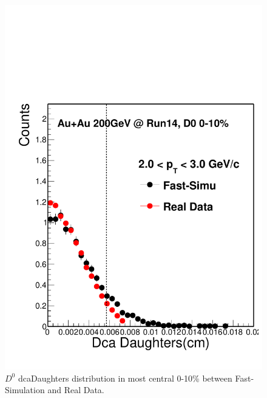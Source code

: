 \documentclass[a4paper]{article}
\begin{document}
\begin{figure}[htbp]
\begin{minipage}[htbp]{0.52\linewidth}
\centering
\includegraphics[width=1.0\textwidth,angle=0]{fig/dcaDaughters.pdf}
\caption{ $D^0$ dcaDaughters distribution in most central 0-10\% between Fast-Simulation and Real Data.\label{dcaDaughters}}
\end{minipage}
\hfill
\begin{minipage}[htbp]{0.52\linewidth}
\centering

\end{minipage}
\end{figure}
\end{document}
